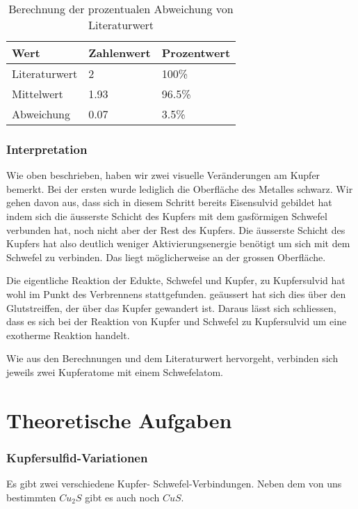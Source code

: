 \documentclass[11pt,paper=a4,final]{scrartcl}
\begin{document}
{\begin{table}[h!]
  \centering
  \begin{tabular}{|l|l|l|}\hline
    \bf Wert & \bf Zahlenwert & Prozentwert \\ \hline
    Literaturwert & 2 & 100\% \\ \hline
    Mittelwert & 1.93 & 96.5\% \\ \hline
    Abweichung & 0.07 & 3.5\% \\ \hline
  \end{tabular}
  \caption{Berechnung der prozentualen Abweichung von Literaturwert}
\end{table}
\section{Interpretation}
Wie oben beschrieben, haben wir zwei visuelle Ver\"anderungen am Kupfer bemerkt.
Bei der ersten wurde lediglich die Oberfl\"ache des Metalles schwarz.  Wir gehen
davon aus, dass sich in diesem Schritt bereits Eisensulvid gebildet hat indem
sich die \"ausserste Schicht des Kupfers mit dem gasf\"ormigen Schwefel
verbunden hat, noch nicht aber der Rest des Kupfers. Die \"ausserste Schicht des
Kupfers hat also deutlich weniger Aktivierungsenergie ben\"otigt um sich mit dem
Schwefel zu verbinden. Das liegt m\"oglicherweise an der grossen Oberfl\"ache.

Die eigentliche Reaktion der Edukte, Schwefel und Kupfer, zu Kupfersulvid hat
wohl im Punkt des Verbrennens stattgefunden. ge\"aussert hat sich dies \"uber
den Glutstreiffen, der \"uber das Kupfer gewandert ist. Daraus l\"asst sich
schliessen, dass es sich bei der Reaktion von Kupfer und Schwefel zu
Kupfersulvid um eine exotherme Reaktion handelt.

Wie aus den Berechnungen und dem Literaturwert hervorgeht, verbinden sich
jeweils zwei Kupferatome mit einem Schwefelatom.
\part{Theoretische Aufgaben}
\section{Kupfersulfid-Variationen}
Es gibt zwei verschiedene Kupfer- Schwefel-Verbindungen\cite{wiki:cs}.
Neben dem von uns bestimmten \(Cu_2S\) gibt es auch noch \(CuS\)\cite{ifa:cs2}.
}
\end{document}
